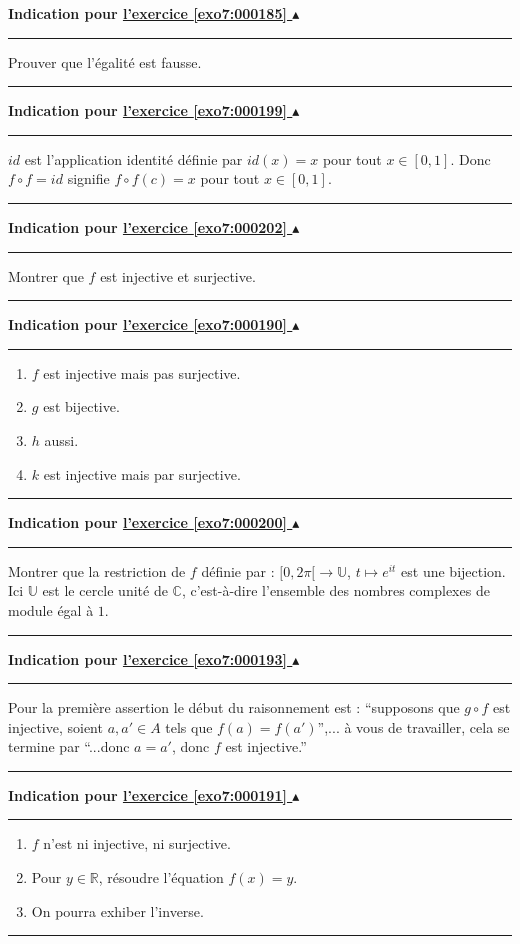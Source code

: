 \documentclass[11pt,a4paper]{article}
\newcommand{\Rr}{\mathbb{R}} \newcommand{\R}{\mathbb{R}}
\newcommand{\Cc}{\mathbb{C}} \newcommand{\C}{\mathbb{C}}
\newcommand{\noindication}{}
\newcounter{exo}
\newcommand{\indication}[1]{\hypertarget{ind7:#1}{}\label{ind7:#1}{\bf Indication pour \hyperlink{exo7:#1}{l'exercice \ref{exo7:#1} $\blacktriangle$}}\vspace{1mm}\hrule\vspace{1mm}}
\newcommand{\finindication}{\vspace{1mm}\hrule\vspace*{7mm}}
\begin{document}
\indication{000185}
Prouver que l'\'egalit\'e est fausse.
\finindication
\indication{000199}
$id$ est l'application identité définie par $id(x)=x$ pour tout $x\in[0,1]$.
Donc $f \circ f= id$ signifie $f\circ f(c) = x$ pour tout $x\in[0,1]$.
\finindication
\indication{000202}
Montrer que $f$ est injective et surjective.
\finindication
\indication{000190}
\begin{enumerate}
\item $f$ est injective mais pas surjective.
\item $g$ est bijective. 
\item $h$ aussi.
\item $k$ est injective mais par surjective.
\end{enumerate}
\finindication
\indication{000200}
Montrer que la restriction de $f$ définie par : 
$[0,2\pi[ \longrightarrow \mathbb{U}$, $t\mapsto e^{it}$ est une bijection.
Ici $\mathbb{U}$ est le cercle unit\'e de $\Cc$, c'est-\`a-dire 
l'ensemble des nombres complexes de module \'egal \`a $1$. 
\finindication
\noindication
\indication{000193}
Pour la premi\`ere assertion le d\'ebut du raisonnement est : ``supposons
que $g\circ f$ est injective, soient $a,a'\in A$ tels que $f(a)=f(a')$'',... 
\`a vous de travailler, cela se termine par
``...donc $a=a'$, donc $f$ est injective.''
\finindication
\indication{000191}
\begin{enumerate}
    \item $f$ n'est ni injective, ni surjective.
    \item Pour $y\in \Rr$, r\'esoudre l'\'equation $f(x)=y$.
    \item On pourra exhiber l'inverse.
\end{enumerate}
\finindication


\newpage
\end{document}
